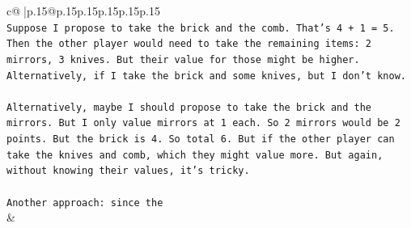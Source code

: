 \documentclass{article}
\begin{document}
{\begin{supertabular}{c@{$\;$}|p{.15\linewidth}@{}p{.15\linewidth}p{.15\linewidth}p{.15\linewidth}p{.15\linewidth}p{.15\linewidth}}
{{{\\ 
\texttt{Suppose I propose to take the brick and the comb. That's 4 + 1 = 5. Then the other player would need to take the remaining items: 2 mirrors, 3 knives. But their value for those might be higher. Alternatively, if I take the brick and some knives, but I don't know.} \\
\\ 
\texttt{Alternatively, maybe I should propose to take the brick and the mirrors. But I only value mirrors at 1 each. So 2 mirrors would be 2 points. But the brick is 4. So total 6. But if the other player can take the knives and comb, which they might value more. But again, without knowing their values, it's tricky.} \\
\\ 
\texttt{Another approach: since the} \\
            }
        }
    }
    & \\ \\


\end{supertabular}}
\end{document}
